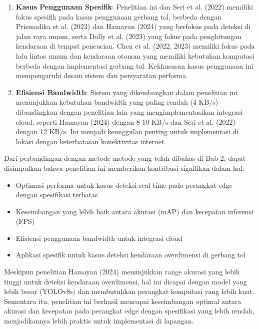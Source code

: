 \begin{enumerate}
    \item \textbf{Kasus Penggunaan Spesifik}: Penelitian ini dan Seri et al. (2022) memiliki fokus spesifik pada kasus penggunaan gerbang tol, berbeda dengan Prismadika et al. (2023) dan Hamayan (2024) yang berfokus pada deteksi di jalan raya umum, serta Dolly et al. (2023) yang fokus pada penghitungan kendaraan di tempat pencucian. Chen et al. (2022, 2023) memiliki fokus pada lalu lintas umum dan kendaraan otonom yang memiliki kebutuhan komputasi berbeda dengan implementasi gerbang tol. Kekhususan kasus penggunaan ini mempengaruhi desain sistem dan persyaratan performa.
    
    \item \textbf{Efisiensi Bandwidth}: Sistem yang dikembangkan dalam penelitian ini menunjukkan kebutuhan bandwidth yang paling rendah (4 KB/s) dibandingkan dengan penelitian lain yang mengimplementasikan integrasi cloud, seperti Hamayan (2024) dengan 8-10 KB/s dan Seri et al. (2022) dengan 12 KB/s. Ini menjadi keunggulan penting untuk implementasi di lokasi dengan keterbatasan konektivitas internet.
\end{enumerate}

Dari perbandingan dengan metode-metode yang telah dibahas di Bab 2, dapat disimpulkan bahwa penelitian ini memberikan kontribusi signifikan dalam hal:

\begin{itemize}
    \item Optimasi performa untuk kasus deteksi real-time pada perangkat edge dengan spesifikasi terbatas
    \item Keseimbangan yang lebih baik antara akurasi (mAP) dan kecepatan inferensi (FPS)
    \item Efisiensi penggunaan bandwidth untuk integrasi cloud
    \item Aplikasi spesifik untuk kasus deteksi kendaraan overdimensi di gerbang tol
\end{itemize}

Meskipun penelitian Hamayan (2024) menunjukkan range akurasi yang lebih tinggi untuk deteksi kendaraan overdimensi, hal ini dicapai dengan model yang lebih besar (YOLOv8s) dan membutuhkan perangkat komputasi yang lebih kuat. Sementara itu, penelitian ini berhasil mencapai keseimbangan optimal antara akurasi dan kecepatan pada perangkat edge dengan spesifikasi yang lebih rendah, menjadikannya lebih praktis untuk implementasi di lapangan.